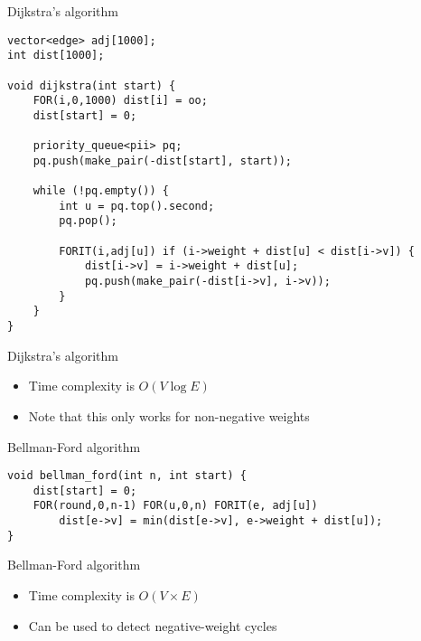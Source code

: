 \documentclass[12pt,t]{beamer}
\newcommand{\bi}{\begin{itemize}}
\newcommand{\ei}{\end{itemize}}
\begin{document}
\begin{frame}[fragile]{Dijkstra's algorithm}
    \begin{verbatim}
vector<edge> adj[1000];
int dist[1000];

void dijkstra(int start) {
    FOR(i,0,1000) dist[i] = oo;
    dist[start] = 0;
    
    priority_queue<pii> pq;
    pq.push(make_pair(-dist[start], start));

    while (!pq.empty()) {
        int u = pq.top().second;
        pq.pop();

        FORIT(i,adj[u]) if (i->weight + dist[u] < dist[i->v]) {
            dist[i->v] = i->weight + dist[u];
            pq.push(make_pair(-dist[i->v], i->v));
        }
    }
}
    \end{verbatim}
\end{frame}

\begin{frame}{Dijkstra's algorithm}
    \vspace{50pt}
    \bi
        \item Time complexity is $O(V \log E)$
        \vspace{10pt}
        \item Note that this only works for non-negative weights
    \ei
\end{frame}

\begin{frame}[fragile]{Bellman-Ford algorithm}
    \begin{verbatim}
void bellman_ford(int n, int start) {
    dist[start] = 0;
    FOR(round,0,n-1) FOR(u,0,n) FORIT(e, adj[u])
        dist[e->v] = min(dist[e->v], e->weight + dist[u]);
}
    \end{verbatim}
\end{frame}

\begin{frame}{Bellman-Ford algorithm}
    \vspace{50pt}
    \bi
        \item Time complexity is $O(V\times E)$
        \vspace{10pt}
        \item Can be used to detect negative-weight cycles
    \ei
\end{frame}
\end{document}

